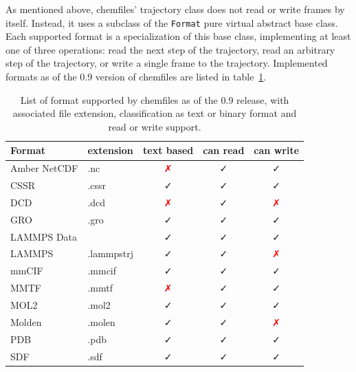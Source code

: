 \documentclass[thesis]{subfiles}
\begin{document}
As mentioned above, chemfiles' trajectory class does not read or write frames by
itself. Instead, it uses a subclass of the \texttt{Format} pure virtual
abstract base class. Each supported format is a specialization of this base
class, implementing at least one of three operations: read the next step of the
trajectory, read an arbitrary step of the trajectory, or write a single frame to
the trajectory. Implemented formats as of the 0.9 version of chemfiles are
listed in table~\ref{tab:chemfiles:formats}.

\begin{table}[ht]
    \centering
    \caption{List of format supported by chemfiles as of the 0.9 release, with
    associated file extension, classification as text or binary format and
    read or write support.}
    \label{tab:chemfiles:formats}
    \def\nope{\textcolor{red}{✗}}
    \def\yep{\textcolor{webgreen}{✓}}
    \begin{tabular}{l l c c c}
        \toprule
        Format                         & extension & text based & can read & can write \\
        \midrule
        Amber NetCDF\cite{AmberNetCDF} & .nc       & \nope      &  \yep    & \yep   \\
        CSSR                           & .cssr     & \yep       &  \yep    & \yep   \\
        DCD                            & .dcd      & \nope      &  \yep    & \nope  \\
        GRO                            & .gro      & \yep       &  \yep    & \yep   \\
        LAMMPS Data                    &           & \yep       &  \yep    & \yep   \\
        LAMMPS                         &.lammpstrj & \yep       &  \yep    & \nope  \\
        mmCIF\cite{Bourne1997}         & .mmcif    & \yep       &  \yep    & \yep   \\
        MMTF\cite{Bradley2017}         & .mmtf     & \nope      &  \yep    & \yep   \\
        MOL2                           & .mol2     & \yep       &  \yep    & \yep   \\
        Molden                         & .molen    & \yep       &  \yep    & \nope  \\
        PDB\cite{Berman2003}           & .pdb      & \yep       &  \yep    & \yep   \\
        SDF                            & .sdf      & \yep       &  \yep    & \yep   \\

\end{tabular}
\end{table}
\end{document}
